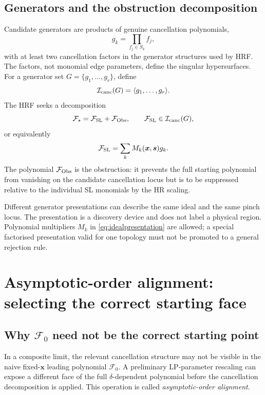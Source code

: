 \documentclass[a4paper,11pt]{article}
\newcommand{\x}{\boldsymbol{x}}
\newcommand{\s}{\boldsymbol{s}}
\newcommand{\FSL}{\mathcal F_{\rm SL}}
\newcommand{\FObs}{\mathcal F_{\rm Obs}}
\begin{document}
\subsection{Generators and the obstruction decomposition}

Candidate generators are products of genuine cancellation polynomials,
\begin{equation}
 g_k=\prod_{f_j\in S_k}f_j,
\end{equation}
with at least two cancellation factors in the generator structures used by
HRF.  The factors, not monomial edge parameters, define the singular
hypersurfaces.  For a generator set \(G=\{g_1,\ldots,g_r\}\), define
\begin{equation}
 \mathcal I_{\rm canc}(G)
 =
 \langle g_1,\ldots,g_r\rangle.
\end{equation}
The HRF seeks a decomposition
\begin{equation}
 \mathcal F_\star=\FSL+\FObs,
 \qquad
 \FSL\in\mathcal I_{\rm canc}(G),
\label{eq:obstruction}
\end{equation}
or equivalently
\begin{equation}
 \FSL=\sum_kM_k(\x,\s)g_k.
\label{eq:idealpresentation}
\end{equation}
The polynomial \(\FObs\) is the obstruction: it prevents the full starting
polynomial from vanishing on the candidate cancellation locus but is to be
suppressed relative to the individual SL monomials by the HR scaling.

Different generator presentations can describe the same ideal and the same
pinch locus.  The presentation is a discovery device and does not label a
physical region.  Polynomial multipliers \(M_k\) in
\eqref{eq:idealpresentation} are allowed; a special factorised presentation
valid for one topology must not be promoted to a general rejection rule.

\section{Asymptotic-order alignment: selecting the correct starting face}
\label{sec:alignment}

\subsection{Why \texorpdfstring{\(\mathcal F_0\)}{F0} need not be the correct starting point}

In a composite limit, the relevant cancellation structure may not be visible
in the naive fixed-\(\x\) leading polynomial \(\mathcal F_0\).  A preliminary
LP-parameter rescaling can expose a different face of the full
\(\delta\)-dependent polynomial before the cancellation decomposition is
applied.  This operation is called \emph{asymptotic-order alignment}.
\end{document}
